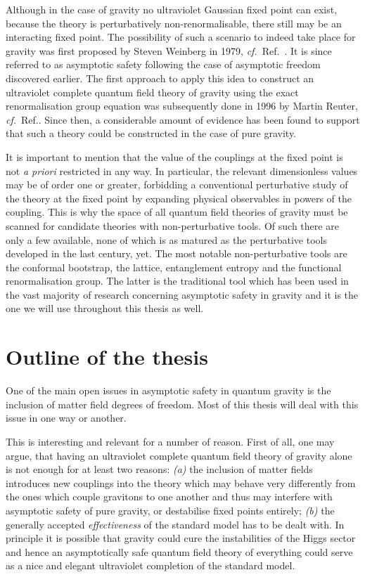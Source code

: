 \documentclass[11pt]{book}
\newcommand\apriori{\textit{a priori} }
\newcommand\cf{\textit{cf.}\ }
\numberwithin{equation}{chapter}
\begin{document}
Although in the case of gravity no ultraviolet Gaussian fixed point can exist,
because the theory is perturbatively non-renormalisable, there still may be
an interacting fixed point.
The possibility of such a scenario to indeed take place for gravity
was first proposed by Steven Weinberg in 1979, \cf Ref.~\cite{Weinberg:1980gg}.
It is since referred to as asymptotic safety following the case of asymptotic
freedom discovered earlier.
The first approach to apply this idea to construct an ultraviolet complete quantum
field theory of gravity using the exact renormalisation group equation
was subsequently done in 1996 by Martin Reuter, \cf Ref.\cite{Reuter:1996cp}.
Since then, a considerable amount of evidence has been found to support that such
a theory could be constructed in the case of pure gravity.

It is important to mention that the value of the couplings at the fixed point is not
\apriori restricted in any way. In particular, the relevant dimensionless values
may be of order one or greater, forbidding a conventional perturbative study of the theory
at the fixed point by expanding physical observables in powers of the coupling.
This is why the space of all quantum field theories of gravity must be scanned for
candidate theories with non-perturbative tools. Of such there are only a few available,
none of which is as matured as the perturbative tools developed in the last century, yet.
The most notable non-perturbative tools are the conformal bootstrap,
the lattice, entanglement entropy and the functional renormalisation group.
The latter is the traditional tool which has been used in the vast majority
of research concerning asymptotic safety in gravity and it is the one we will use
throughout this thesis as well.


\section*{Outline of the thesis}

One of the main open issues in asymptotic safety in quantum gravity is
the inclusion of matter field degrees of freedom. Most of this thesis
will deal with this issue in one way or another.

This is interesting and relevant for a number of reason. First of all,
one may argue, that having an ultraviolet complete quantum field theory
of gravity alone is not enough for at least two reasons:
\textit{(a)} the inclusion of matter fields introduces new couplings into
the theory which may behave very differently from the ones which couple
gravitons to one another and thus may interfere with asymptotic safety of
pure gravity, or destabilise fixed points entirely;
\textit{(b)} the generally accepted \textit{effectiveness} of the
standard model has to be dealt with.
In principle it is possible that gravity could cure the instabilities
of the Higgs sector and hence an asymptotically safe quantum
field theory of everything could serve as a nice and elegant ultraviolet completion
of the standard model.
\end{document}
